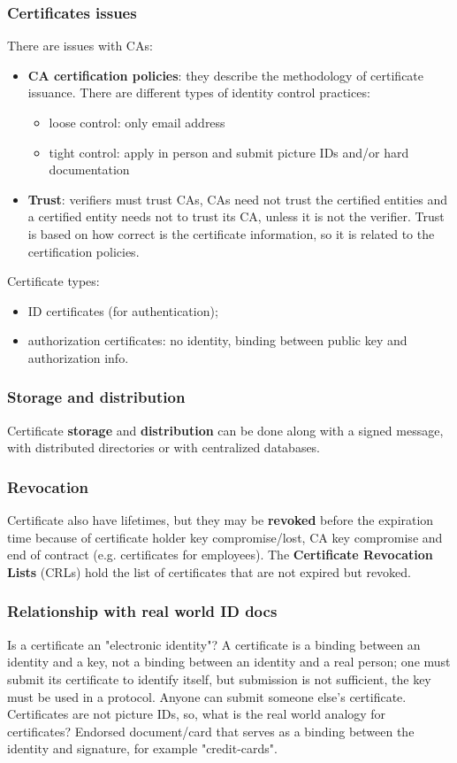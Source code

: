 \documentclass[a4paper, 10pt, titlepage]{article}
\begin{document}
\subsubsection*{Certificates issues}
There are issues with CAs:
\begin{itemize}
\item \textbf{CA certification policies}: they describe the methodology of certificate issuance. There are different types of identity control practices:
	\begin{itemize}
	\item loose control: only email address
	\item tight control: apply in person and submit picture IDs and/or hard documentation
	\end{itemize}
\item \textbf{Trust}: verifiers must trust CAs, CAs need not trust the certified entities and a certified entity needs not to trust its CA, unless it is not the verifier.
Trust is based on how correct is the certificate information, so it is related to the certification policies.
\end{itemize}
Certificate types:
\begin{itemize}
\item ID certificates (for authentication);
\item authorization certificates: no identity, binding between public key and authorization info.
\end{itemize}

\subsubsection*{Storage and distribution}
Certificate \textbf{storage} and \textbf{distribution} can be done along with a signed message, with distributed directories or with centralized databases.
\subsubsection*{Revocation}
Certificate also have lifetimes, but they may be \textbf{revoked} before the expiration time because of certificate holder key compromise/lost, CA key compromise and  end of contract (e.g. certificates for employees). The \textbf{Certificate Revocation Lists} (CRLs) hold the list of certificates that are not expired but revoked.

\subsubsection*{Relationship with real world ID docs}
Is a certificate an "electronic identity"? A certificate is a binding between an identity and a key, not a binding between an identity and a real person; one must submit its certificate to identify itself, but submission is not sufficient, the key must be used in a protocol. Anyone can submit someone else’s certificate. Certificates are not picture IDs, so, what is the real world analogy for certificates?
Endorsed document/card that serves as a binding between the identity and signature, for example "credit-cards".
\end{document}
